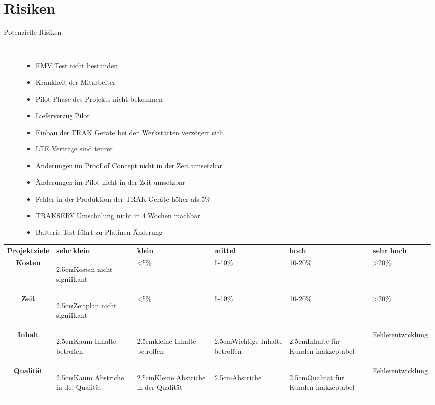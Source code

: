 \documentclass[a4paper,10pt]{scrartcl}
\newcommand\Risiko[2][2.5cm]{\begin{varwidth}{#1}\flushleft#2\end{varwidth}}
\begin{document}
\section{Risiken}
\begin{description}
\item[Potenzielle Risiken]~\par
\begin{itemize}
      \item EMV Test nicht bestanden
      \item Krankheit der Mitarbeiter
      \item Pilot Phase des Projekts nicht bekommen
      \item Lieferverzug Pilot
      \item Einbau der TRAK Geräte bei den Werkstätten verzögert sich
      \item LTE Verträge sind teurer
      \item Änderungen im Proof of Concept nicht in der Zeit umsetzbar
      \item Änderungen im Pilot nicht in der Zeit umsetzbar
      \item Fehler in der Produktion der TRAK-Geräte höher als 5\%
      \item TRAKSERV Umschulung nicht in 4 Wochen machbar
      \item Batterie Test führt zu Platinen Änderung
   \end{itemize}
\end{description}

\begin{adjustbox}{width=\textwidth}
\begin{tabular}{c | x | x | y | y | z}
\toprule
{}
\textbf{Projektziele} & \textbf{sehr klein} & \textbf{klein} & \textbf{mittel} & \textbf{hoch} & \textbf{sehr hoch} \\
\cmidrule(lr){1-1}\cmidrule(lr){2-6}
\textbf{Kosten} & {\Risiko{Kosten nicht signifikant}} & <5\% & 5-10\% & 10-20\% & >20\%\\
\midrule
\textbf{Zeit} & {\Risiko{Zeitplan nicht signifikant}} & <5\% & 5-10\% & 10-20\% & >20\%\\
\midrule
\textbf{Inhalt} & {\Risiko{Kaum Inhalte betroffen}} & {\Risiko{kleine Inhalte betroffen}} & {\Risiko{Wichtige Inhalte betroffen}} & {\Risiko{Inhalte für Kunden inakzeptabel}} & Fehlerentwicklung\\
\midrule
\textbf{Qualität} & {\Risiko{Kaum Abstriche in der Qualität}} & {\Risiko{Kleine Abstriche in der Qualität}} & {\Risiko{Abstriche}} & {\Risiko{Qualität für Kunden inakzeptabel}} & Fehlerentwicklung\\
\bottomrule
\end{tabular}
\end{adjustbox}
\end{document}
